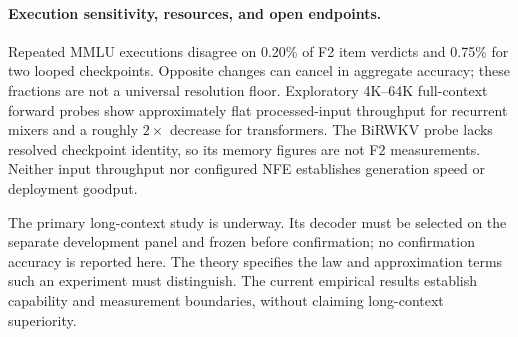 \paragraph{Execution sensitivity, resources, and open endpoints.}
Repeated MMLU executions disagree on 0.20\% of F2 item verdicts and 0.75\% for two
looped checkpoints. Opposite changes can cancel in aggregate accuracy; these fractions
are not a universal resolution floor. Exploratory 4K--64K full-context forward probes
show approximately flat processed-input throughput for recurrent mixers and a roughly
$2\times$ decrease for transformers. The BiRWKV probe lacks resolved checkpoint
identity, so its memory figures are not F2 measurements. Neither input throughput nor
configured NFE establishes generation speed or deployment goodput.

The primary long-context study is underway. Its decoder must be selected on the
separate development panel and frozen before confirmation; no confirmation accuracy is
reported here. The theory specifies the law and approximation terms such an experiment
must distinguish. The current empirical results establish capability and measurement
boundaries, without claiming long-context superiority.
